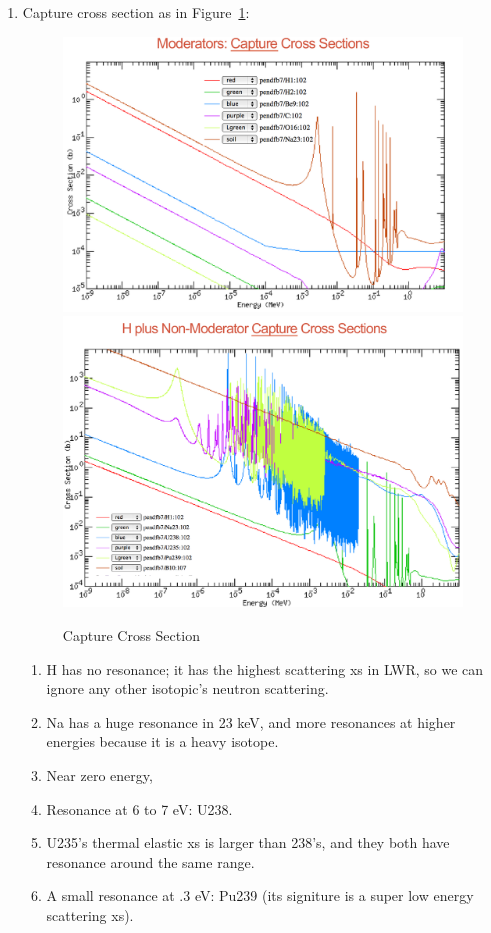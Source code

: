 \documentclass{school-22.211-notes}
\begin{document}
\begin{enumerate}
\item Capture cross section as in Figure~\ref{capture-xs}: 
  \begin{figure}
    \centering
    \includegraphics[width=6in]{images/intro/capture-xs.png}
    \\
    \includegraphics[width=6in]{images/intro/capture-xs-2.png}
    \caption{Capture Cross Section} \label{capture-xs}
  \end{figure}
  \begin{enumerate}
  \item H has no resonance; it has the highest scattering xs in LWR, so we can ignore any other isotopic's neutron scattering.   
  \item Na has a huge resonance in 23 keV, and more resonances at higher energies because it is a heavy isotope.
  \item Near zero energy,
  \item Resonance at 6 to 7 eV: U238. 
  \item U235's thermal elastic xs is larger than 238's, and they both have resonance around the same range.   
  \item A small resonance at .3 eV: Pu239 (its signiture is a super low energy scattering xs). 
  \end{enumerate}


\end{enumerate}
\end{document}

